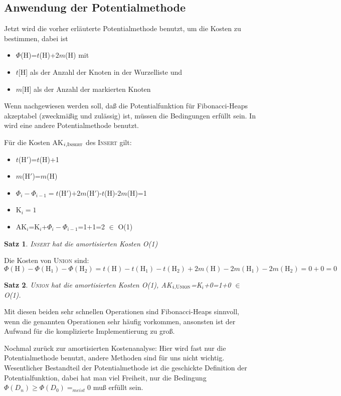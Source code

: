 \documentclass[ngerman,draft,parskip=half*,twoside]{scrreprt}
\theoremstyle{break}
\newtheorem{satz}{Satz}
\begin{document}
\subsection{Anwendung der Potentialmethode}
Jetzt wird die vorher erläuterte Potentialmethode benutzt, um die Kosten zu bestimmen, dabei ist
\begin{itemize}
\item $\Phi$(H)=$t$(H)+$2m$(H) mit
\item $t$[H] als der Anzahl der Knoten in der Wurzelliste und
\item $m$[H] als der Anzahl der markierten Knoten
\end{itemize}
Wenn nachgewiesen werden soll, daß die Potentialfunktion für Fibonacci-Heaps akzeptabel (zweckmäßig und zulässig)
ist, müssen die Bedingungen erfüllt sein. In \cite{ottmann} wird eine andere Potentialmethode benutzt.

Für die Kosten AK$_{i, \textsc{Insert}}$ des \textsc{Insert} gilt:
\begin{itemize}
\item $t$(H$'$)=$t$(H)+1
\item $m$(H$'$)=$m$(H)
\item ${\Phi}_i-{\Phi}_{i-1}=t$(H$'$)$+2m$(H$'$)-$t$(H)-$2m$(H)=1
\item K$_i=1$
\item AK$_i$=K$_i$+${\Phi}_i-{\Phi}_{i-1}$=1+1=2 $\in$ O(1)
\end{itemize}

\begin{satz}
\textsc{Insert} hat die amortisierten Kosten O(1)
\end{satz}

Die Kosten von \textsc{Union} sind:
\[\Phi(\mbox{H})-\Phi(\mbox{H}_1)-\Phi(\mbox{H}_2)=t(\mbox{H})-t(\mbox{H}_1)-t(\mbox{H}_2)+2m(\mbox{H})-2m(\mbox{H}_1)-
2m(\mbox{H}_2)=0+0=0\]

\begin{satz}
\textsc{Union} hat die amortisierten Kosten O(1), AK$_{i, \textsc{Union}}$=K$_i$+0=1+0 $\in$ O(1).
\end{satz}

Mit diesen beiden sehr schnellen Operationen sind Fibonacci-Heaps sinnvoll, wenn die genannten Operationen sehr häufig
vorkommen, ansonsten ist der Aufwand für die komplizierte Implementierung zu groß.

Nochmal zurück zur amortisierten Kostenanalyse:
Hier wird fast nur die Potentialmethode benutzt, andere Methoden sind für uns nicht wichtig. Wesentlicher Bestandteil
der Potentialmethode ist die geschickte Definition der Potentialfunktion, dabei hat man viel Freiheit, nur die Bedingung $\Phi
(D_n) \geq \Phi(D_0)=_{meist}0$ muß erfüllt sein.
\end{document}
